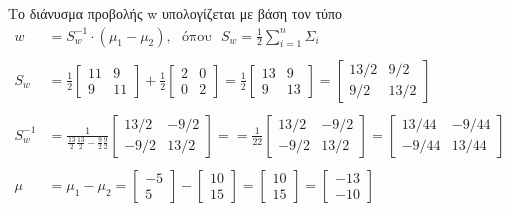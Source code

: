 \documentclass{article}
\begin{document}
	\pagebreak
	\noindent
	Το διάνυσμα προβολής w υπολογίζεται με βάση τον τύπο
	\begin{align*}
		w &= S_{w}^{-1} \cdot (μ_{1} - μ_{2}), \ \ \ 
		\text{όπου} \  \  \ 
		S_{w} = \frac{1}{2} \sum_{i=1}^{n} Σ_{i}\\ \\
		S_{w} &= \frac{1}{2} 
				 \begin{bmatrix}
				 	 11 & 9 \\
					 9 & 11
				 \end{bmatrix} + 
				 \frac{1}{2} 
				 \begin{bmatrix}
					 2 & 0 \\
					 0 & 2
				 \end{bmatrix}
			  = \frac{1}{2} 
				 \begin{bmatrix}
				 	13 & 9 \\
				  	9 & 13
				 \end{bmatrix}
			 = \begin{bmatrix}
				 	13/2 & 9/2 \\
				 	9/2 & 13/2
			   \end{bmatrix}\\ \\
		S_{w}^{-1} &= \frac{1}{\frac{13}{2}\frac{13}{2} - \frac{9}{2}\frac{9}{2}} 
					  \begin{bmatrix}
					  	13/2 & -9/2 \\
					  	-9/2 & 13/2
					  \end{bmatrix} = 
				  =  \frac{1}{22}
					 \begin{bmatrix}
					 	13/2 & -9/2 \\
					  	-9/2 & 13/2
					 \end{bmatrix}
				 = 	\begin{bmatrix}
					 	13/44 & -9/44 \\
					 	-9/44 & 13/44
					\end{bmatrix}\\ \\
		μ &= μ_{1} - μ_{2} = \begin{bmatrix}
								-5 \\
								5 
							\end{bmatrix} - 
							\begin{bmatrix}
								10 \\
								15
							\end{bmatrix}
						  = \begin{bmatrix}
								10 \\
								15
						  	\end{bmatrix}
					  	  = \begin{bmatrix}
						  	  	-13 \\
						  	  	-10
						  	\end{bmatrix}
	\end{align*}
\end{document}

